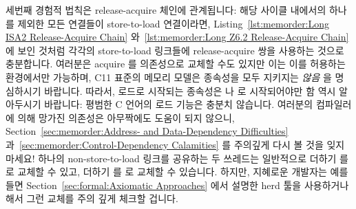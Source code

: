 세번째 경험적 법칙은 release-acquire 체인에 관계됩니다:
해당 사이클 내에서의 하나를 제외한 모든 연결들이 store-to-load 연결이라면,
Listing~\ref{lst:memorder:Long ISA2 Release-Acquire Chain}
와~\ref{lst:memorder:Long Z6.2 Release-Acquire Chain} 에 보인 것처럼 각각의
store-to-load 링크들에 release-acquire 쌍을 사용하는 것으로 충분합니다.
여러분은 acquire 를 의존성으로 교체할 수도 있지만 이는 이를 허용하는 환경에서만
가능하며, C11 표준의 메모리 모델은 종속성을 모두 지키지는 \emph{않음} 을
명심하시기 바랍니다.
따라서, 로드로 시작되는 종속성은  나  로
시작되어야만 함 역시 알아두시기 바랍니다:
평범한 C 언어의 로드 기능은 충분치 않습니다.
여러분의 컴파일러에 의해 망가진 의존성은 아무짝에도 도움이 되지 않으니,
Section~\ref{sec:memorder:Address- and Data-Dependency Difficulties}
과~\ref{sec:memorder:Control-Dependency Calamities} 를 주의깊게 다시 볼 것을
잊지 마세요!
하나의 non-store-to-load 링크를 공유하는 두 쓰레드는 일반적으로
 더하기  를  로 교체할
수 있고,  더하기  를  로
교체할 수 있습니다.
하지만, 지혜로운 개발자는 예를 들면
Section~\ref{sec:formal:Axiomatic Approaches} 에서 설명한 herd 툴을 사용하거나
해서 그런 교체를 주의 깊게 체크할 겁니다.

